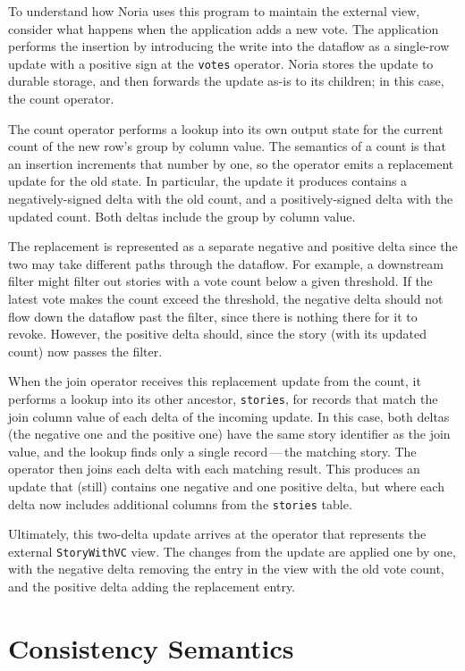 To understand how Noria uses this program to maintain the external view,
consider what happens when the application adds a new vote. The application
performs the insertion by introducing the write into the dataflow as a
single-row update with a positive sign at the \texttt{votes} operator. Noria
stores the update to durable storage, and then forwards the update as-is to its
children; in this case, the count operator.

The count operator performs a lookup into its own output state for the current
count of the new row's group by column value. The semantics of a count is that
an insertion increments that number by one, so the operator emits a replacement
update for the old state. In particular, the update it produces contains a
negatively-signed delta with the old count, and a positively-signed delta with
the updated count. Both deltas include the group by column value.

The replacement is represented as a separate negative and positive delta since
the two may take different paths through the dataflow. For example, a downstream
filter might filter out stories with a vote count below a given threshold. If
the latest vote makes the count exceed the threshold, the negative delta should
not flow down the dataflow past the filter, since there is nothing there for it
to revoke. However, the positive delta should, since the story (with its updated
count) now passes the filter.

When the join operator receives this replacement update from the count, it
performs a lookup into its other ancestor, \texttt{stories}, for records that
match the join column value of each delta of the incoming update. In this case,
both deltas (the negative one and the positive one) have the same story
identifier as the join value, and the lookup finds only a single
record\,---\,the matching story. The operator then joins each delta with each
matching result. This produces an update that (still) contains one negative and
one positive delta, but where each delta now includes additional columns from
the \texttt{stories} table.

Ultimately, this two-delta update arrives at the operator that represents the
external \texttt{StoryWithVC} view. The changes from the update are applied one
by one, with the negative delta removing the entry in the view with the old vote
count, and the positive delta adding the replacement entry.

\section{Consistency Semantics}
\label{s:noria:consistency}

